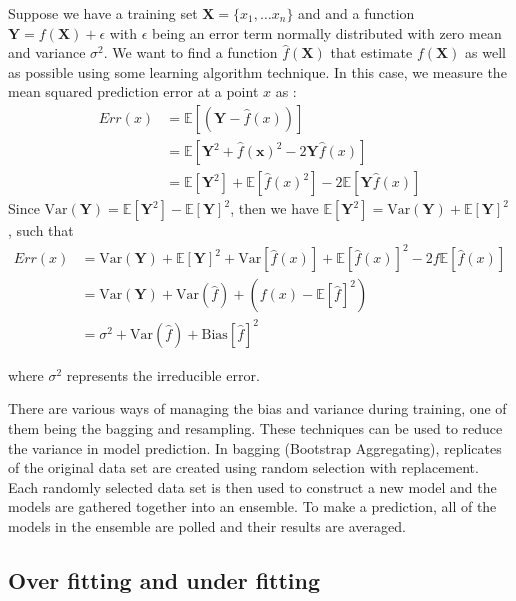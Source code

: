 Suppose  we have a training set $\textbf{X}=\{x_1,\dots x_n\}$ and and a function $\textbf{Y}=f(\textbf{X})+\epsilon$ with $\epsilon$ being an error term normally distributed with zero mean and variance $\sigma^2$. We want to find a function $\widehat{f}(\textbf{X})$  that estimate $f(\textbf{X})$ as well as possible using some learning algorithm technique. In this case, we measure the mean squared prediction error at a point $x$ as :
\begin{align*}
Err(x)&= \mathbb{E}\left[(\textbf{Y}- \widehat{f}(x) ) \right]\\
&= \mathbb{E}\left[ \textbf{Y}^2 +\widehat{f}(\textbf{x})^2 -2\textbf{Y}\widehat{f}(x)\right]\\
&= \mathbb{E}\left[\textbf{Y}^2 \right] + \mathbb{E}\left[\widehat{f}(x)^2 \right]- 2\mathbb{E}\left[\textbf{Y}\widehat{f}(x)\right]
\end{align*}
Since $\text{Var}(\textbf{Y}) = \mathbb{E}\left[\textbf{Y}^2 \right]- \mathbb{E}\left[\textbf{Y}\right]^2$, then we have  $\mathbb{E}\left[\textbf{Y}^2 \right] =\text{Var}(\textbf{Y}) + \mathbb{E}\left[\textbf{Y}\right]^2$, such that
\begin{align*}
Err(x)&= \text{Var}(\textbf{Y}) + \mathbb{E}\left[\textbf{Y}\right]^2 + \text{Var}\left[\widehat{f}(x)\right] + \mathbb{E}\left[\widehat{f}(x) \right]^2- 2f\mathbb{E}\left[\widehat{f}(x) \right]\\
&= \text{Var}(\textbf{Y}) + \text{Var}(\widehat{f}) + (f(x)- \mathbb{E}\left[
\widehat{f}\right]^2)\\
&= \sigma^2 + \text{Var}(\widehat{f})+ \text{Bias}\left[\widehat{f}\right]^2
\end{align*}

where $\sigma^2$ represents the irreducible error. 

There are various ways of managing the bias and variance during training, one of them being the bagging  and resampling. These techniques can be used to reduce the variance in model prediction. In bagging (Bootstrap Aggregating), replicates of the original data set are created using random selection with replacement. Each randomly selected data set is then used to construct a new model and the models are gathered together into an ensemble. To make a prediction, all of the models in the ensemble are polled and their results are averaged.

\subsection{Over fitting and under fitting}

